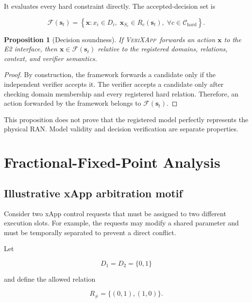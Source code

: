 \documentclass[pdflatex,sn-mathphys-num,iicol,oneside]{sn-jnl}
\newcommand{\method}{\textsc{VeriXApp}}
\newtheorem{proposition}{Proposition}
\begin{document}
It evaluates every hard constraint directly. The accepted-decision
set is

\begin{equation}
\mathcal{F}(\bm{s}_t)
=
\left\{
\bm{x}:
x_i\in D_i,
\;
\bm{x}_{S_c}\in R_c(\bm{s}_t),
\;
\forall c\in\mathcal{C}_{\mathrm{hard}}
\right\}.
\end{equation}

\begin{proposition}[Decision soundness]
If \method\ forwards an action $\bm{x}$ to the E2 interface, then
$\bm{x}\in\mathcal{F}(\bm{s}_t)$ relative to the registered domains,
relations, context, and verifier semantics.
\end{proposition}

\begin{proof}
By construction, the framework forwards a candidate only if the
independent verifier accepts it. The verifier accepts a candidate
only after checking domain membership and every registered hard
relation. Therefore, an action forwarded by the framework belongs to
$\mathcal{F}(\bm{s}_t)$.
\end{proof}

This proposition does not prove that the registered model perfectly
represents the physical RAN. Model validity and decision verification
are separate properties.

\section{Fractional-Fixed-Point Analysis}
\label{sec:analysis}

\subsection{Illustrative xApp arbitration motif}

Consider two xApp control requests that must be assigned to two
different execution slots. For example, the requests may modify a
shared parameter and must be temporally separated to prevent a direct
conflict.

Let

\begin{equation}
D_1=D_2=\{0,1\}
\end{equation}

and define the allowed relation

\begin{equation}
R_{\neq}
=
\{(0,1),(1,0)\}.
\end{equation}
\end{document}
